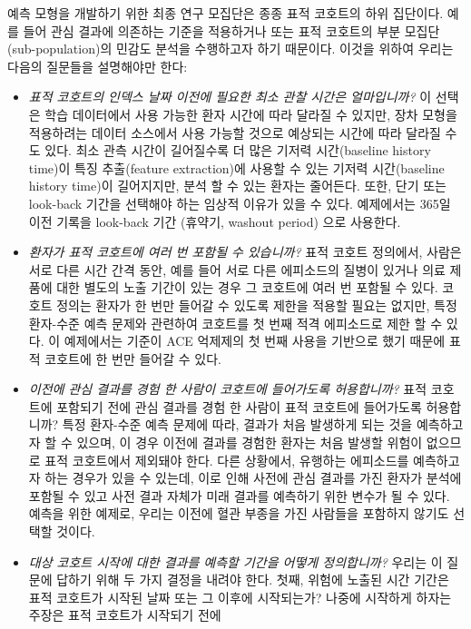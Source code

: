 \documentclass[11pt]{book}
\theoremstyle{definition}
\theoremstyle{definition}
\theoremstyle{definition}
\theoremstyle{remark}
\begin{document}
예측 모형을 개발하기 위한 최종 연구 모집단은 종종 표적 코호트의 하위
집단이다. 예를 들어 관심 결과에 의존하는 기준을 적용하거나 또는 표적
코호트의 부분 모집단(sub-population)의 민감도 분석을 수행하고자 하기
때문이다. 이것을 위하여 우리는 다음의 질문들을 설명해야만 한다:

\begin{itemize}
\item
  \emph{표적 코호트의 인덱스 날짜 이전에 필요한 최소 관찰 시간은
  얼마입니까?} 이 선택은 학습 데이터에서 사용 가능한 환자 시간에 따라
  달라질 수 있지만, 장차 모형을 적용하려는 데이터 소스에서 사용 가능할
  것으로 예상되는 시간에 따라 달라질 수도 있다. 최소 관측 시간이
  길어질수록 더 많은 기저력 시간(baseline history time)이 특징
  추출(feature extraction)에 사용할 수 있는 기저력 시간(baseline history
  time)이 길어지지만, 분석 할 수 있는 환자는 줄어든다. 또한, 단기 또는
  look-back 기간을 선택해야 하는 임상적 이유가 있을 수 있다. 예제에서는
  365일 이전 기록을 look-back 기간 (휴약기, washout period) 으로
  사용한다.
\item
  \emph{환자가 표적 코호트에 여러 번 포함될 수 있습니까?} 표적 코호트
  정의에서, 사람은 서로 다른 시간 간격 동안, 예를 들어 서로 다른
  에피소드의 질병이 있거나 의료 제품에 대한 별도의 노출 기간이 있는 경우
  그 코호트에 여러 번 포함될 수 있다. 코호트 정의는 환자가 한 번만
  들어갈 수 있도록 제한을 적용할 필요는 없지만, 특정 환자-수준 예측
  문제와 관련하여 코호트를 첫 번째 적격 에피소드로 제한 할 수 있다. 이
  예제에서는 기준이 ACE 억제제의 첫 번째 사용을 기반으로 했기 때문에
  표적 코호트에 한 번만 들어갈 수 있다.
\item
  \emph{이전에 관심 결과를 경험 한 사람이 코호트에 들어가도록
  허용합니까?} 표적 코호트에 포함되기 전에 관심 결과를 경험 한 사람이
  표적 코호트에 들어가도록 허용합니까? 특정 환자-수준 예측 문제에 따라,
  결과가 처음 발생하게 되는 것을 예측하고자 할 수 있으며, 이 경우 이전에
  결과를 경험한 환자는 처음 발생할 위험이 없으므로 표적 코호트에서
  제외돼야 한다. 다른 상황에서, 유행하는 에피소드를 예측하고자 하는
  경우가 있을 수 있는데, 이로 인해 사전에 관심 결과를 가진 환자가 분석에
  포함될 수 있고 사전 결과 자체가 미래 결과를 예측하기 위한 변수가 될 수
  있다. 예측을 위한 예제로, 우리는 이전에 혈관 부종을 가진 사람들을
  포함하지 않기도 선택할 것이다.
\item
  \emph{대상 코호트 시작에 대한 결과를 예측할 기간을 어떻게 정의합니까?}
  우리는 이 질문에 답하기 위해 두 가지 결정을 내려야 한다. 첫째, 위험에
  노출된 시간 기간은 표적 코호트가 시작된 날짜 또는 그 이후에
  시작되는가? 나중에 시작하게 하자는 주장은 표적 코호트가 시작되기 전에

\end{itemize}
\end{document}
